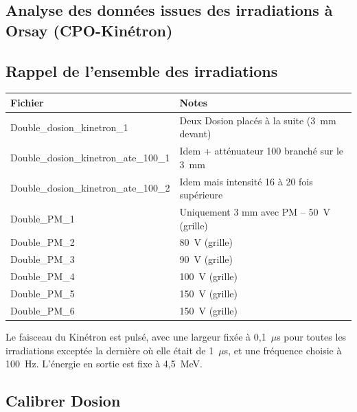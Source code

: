 \documentclass[a4paper,11pt]{article}
\begin{document}
\setmarginsrb{3.5cm}{1.5cm}{1.5cm}{2cm}{2ex}{3ex}{2ex}{5ex}
%
\lhead[]{}
\fancyfoot[C]{}
\fancyfoot[R]{\thepage}

\begin{center}
\subsection*{Analyse des données issues des irradiations à Orsay (CPO-Kinétron)}
\end{center}

\subsection*{Rappel de l'ensemble des irradiations}
\begin{center}
\begin{tabular}{ll}
Fichier&Notes\\
\hline
\hline
Double\_dosion\_kinetron\_1&Deux Dosion placés à la suite (3~mm devant)\\
Double\_dosion\_kinetron\_ate\_100\_1&Idem + atténuateur 100 branché sur le 3~mm\\
Double\_dosion\_kinetron\_ate\_100\_2&Idem mais intensité 16 à 20 fois supérieure\\
Double\_PM\_1&Uniquement 3 mm avec PM -- 50~V (grille)\\
Double\_PM\_2&80~V (grille)\\
Double\_PM\_3&90~V (grille)\\
Double\_PM\_4&100~V (grille)\\
Double\_PM\_5&150~V (grille)\\
Double\_PM\_6&150~V (grille)\\
\hline
\end{tabular}
\end{center}

Le faisceau du Kinétron est pulsé, avec une largeur fixée à 0,1~$\mu$s pour toutes les irradiations exceptée la dernière où elle était de 1~$\mu$s, et une fréquence choisie à 100~Hz.
L'énergie en sortie est fixe à 4,5~MeV.

\subsection*{Calibrer Dosion}
\end{document}

